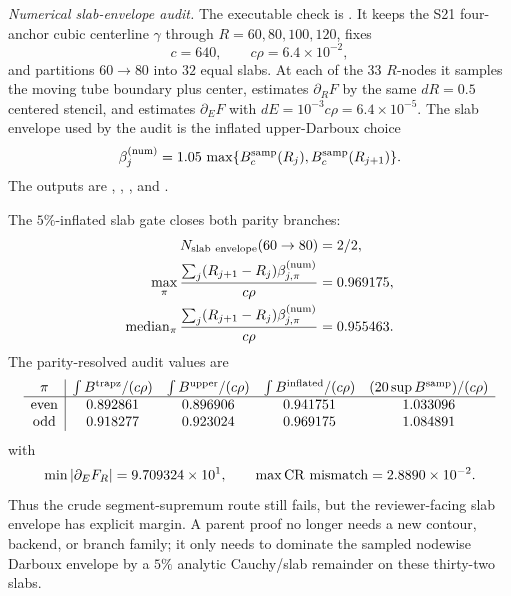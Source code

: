 \documentclass[aps,prd,onecolumn,notitlepage,nofootinbib,superscriptaddress,11pt,floatfix]{revtex4-2}
\begin{document}
\emph{Numerical slab-envelope audit.}
The executable check is
.  It keeps the S21
four-anchor cubic centerline \(\gamma\) through \(R=60,80,100,120\), fixes
\[
c=640,\qquad c\rho=6.4\times10^{-2},
\]
and partitions \(60\to80\) into \(32\) equal slabs.  At each of the \(33\)
\(R\)-nodes it samples the moving tube boundary plus center, estimates
\(\partial_RF\) by the same \(dR=0.5\) centered stencil, and estimates
\(\partial_EF\) with \(dE=10^{-3}c\rho=6.4\times10^{-5}\).  The slab envelope
used by the audit is the inflated upper-Darboux choice
\[
\beta_j^{\rm(num)}
=1.05\,\max\{B^{\rm samp}_c(R_j),B^{\rm samp}_c(R_{j+1})\}.
\]
The outputs are
,
,
, and
.

The \(5\%\)-inflated slab gate closes both parity branches:
\[
\begin{aligned}
N_{\rm slab\ envelope}(60\to80)&=2/2,\\
\max_{\pi}\frac{\sum_j (R_{j+1}-R_j)\beta^{\rm(num)}_{j,\pi}}{c\rho}
&=0.969175,\\
\operatorname{median}_{\pi}\frac{\sum_j (R_{j+1}-R_j)\beta^{\rm(num)}_{j,\pi}}{c\rho}
&=0.955463.
\end{aligned}
\]
The parity-resolved audit values are
\[
\begin{array}{c|cccc}
\pi & \int B^{\rm trapz}/(c\rho) &
\int B^{\rm upper}/(c\rho) &
\int B^{\rm inflated}/(c\rho) &
(20\sup B^{\rm samp})/(c\rho)\\
\hline
{\rm even} & 0.892861 & 0.896906 & 0.941751 & 1.033096\\
{\rm odd}  & 0.918277 & 0.923024 & 0.969175 & 1.084891
\end{array}
\]
with
\[
\min|\partial_EF_R|=9.709324\times10^1,\qquad
\max{\rm CR\ mismatch}=2.8890\times10^{-2}.
\]
Thus the crude segment-supremum route still fails, but the reviewer-facing
slab envelope has explicit margin.  A parent proof no longer needs a new
contour, backend, or branch family; it only needs to dominate the sampled
nodewise Darboux envelope by a \(5\%\) analytic Cauchy/slab remainder on these
thirty-two slabs.
\end{document}
